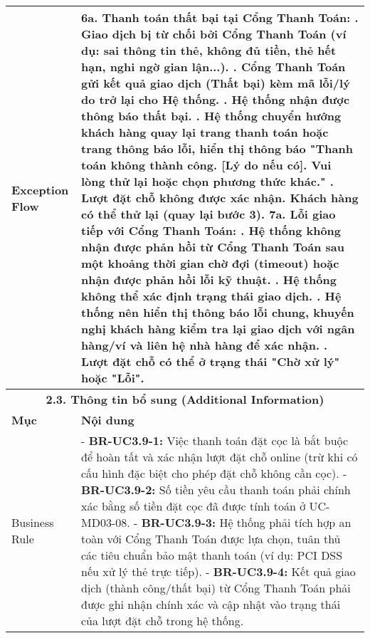 \begin{longtable}{|m{4cm}|p{11cm}|}
Exception Flow & \textbf{6a. Thanh toán thất bại tại Cổng Thanh Toán:} \newline    1. Giao dịch bị từ chối bởi Cổng Thanh Toán (ví dụ: sai thông tin thẻ, không đủ tiền, thẻ hết hạn, nghi ngờ gian lận...). \newline    2. Cổng Thanh Toán gửi kết quả giao dịch (Thất bại) kèm mã lỗi/lý do trở lại cho Hệ thống. \newline    3. Hệ thống nhận được thông báo thất bại. \newline    4. Hệ thống chuyển hướng khách hàng quay lại trang thanh toán hoặc trang thông báo lỗi, hiển thị thông báo "Thanh toán không thành công. [Lý do nếu có]. Vui lòng thử lại hoặc chọn phương thức khác." \newline    5. Lượt đặt chỗ không được xác nhận. Khách hàng có thể thử lại (quay lại bước 3). \newline \textbf{7a. Lỗi giao tiếp với Cổng Thanh Toán:} \newline    1. Hệ thống không nhận được phản hồi từ Cổng Thanh Toán sau một khoảng thời gian chờ đợi (timeout) hoặc nhận được phản hồi lỗi kỹ thuật. \newline    2. Hệ thống không thể xác định trạng thái giao dịch. \newline    3. Hệ thống nên hiển thị thông báo lỗi chung, khuyến nghị khách hàng kiểm tra lại giao dịch với ngân hàng/ví và liên hệ nhà hàng để xác nhận. \newline    4. Lượt đặt chỗ có thể ở trạng thái "Chờ xử lý" hoặc "Lỗi". \\
\hline
\multicolumn{2}{|c|}{\textbf{2.3. Thông tin bổ sung (Additional Information)}} \\
\hline
\textbf{Mục} & \textbf{Nội dung} \\
\hline
Business Rule & - \textbf{BR-UC3.9-1:} Việc thanh toán đặt cọc là bắt buộc để hoàn tất và xác nhận lượt đặt chỗ online (trừ khi có cấu hình đặc biệt cho phép đặt chỗ không cần cọc). \newline - \textbf{BR-UC3.9-2:} Số tiền yêu cầu thanh toán phải chính xác bằng số tiền đặt cọc đã được tính toán ở UC-MD03-08. \newline - \textbf{BR-UC3.9-3:} Hệ thống phải tích hợp an toàn với Cổng Thanh Toán được lựa chọn, tuân thủ các tiêu chuẩn bảo mật thanh toán (ví dụ: PCI DSS nếu xử lý thẻ trực tiếp). \newline - \textbf{BR-UC3.9-4:} Kết quả giao dịch (thành công/thất bại) từ Cổng Thanh Toán phải được ghi nhận chính xác và cập nhật vào trạng thái của lượt đặt chỗ trong hệ thống. \\

\end{longtable}
